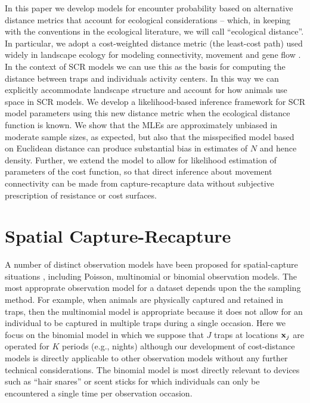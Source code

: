 \documentclass[12pt]{article}
\begin{document}
In this paper we develop models for encounter probability based on
alternative distance metrics that account for ecological
considerations -- which, in keeping with the conventions in the
ecological literature, we will call ``ecological distance''. In
particular, we adopt a cost-weighted distance metric (the least-cost path)
used widely in landscape ecology for modeling connectivity,
movement and gene flow
\citep{adriaensen_etal:2003,manel_etal:2003,mcrae_etal:2008}. In the
context of SCR models we can use this as the basis for computing the
distance between traps and individuals activity centers. In this way
we can explicitly accommodate landscape structure and
account for how animals use space in SCR models. We develop a
likelihood-based inference framework for SCR model parameters using
this new distance metric when the ecological distance function is
known.  We show that the MLEs are approximately unbiased in moderate
sample sizes, as expected, but also that the misspecified model based
on Euclidean distance can produce substantial bias in estimates of $N$
and hence density.  Further, we extend the model to allow for likelihood 
estimation of parameters of the cost function, so that direct inference
about movement connectivity can be made from capture-recapture data without subjective prescription
of resistance or cost surfaces.


\section{Spatial Capture-Recapture}

A number of distinct observation models have been proposed for
spatial-capture situations \citep{borchers_efford:2008,
  royle_etal:2009ecol, efford_etal:2009ecol}, including Poisson, multinomial or binomial
observation models. The most
approprate observation model for a dataset depends upon the the
sampling method.
For example, when animals are physically captured and retained
in traps, then the multinomial model is appropriate because it does not
allow for an individual to be captured in multiple traps during a
single occasion. Here we focus on the binomial model in which we
suppose that $J$ traps at locations ${\bf x}_{j}$ are operated for $K$
periods (e.g., nights) although our development of cost-distance
models is directly applicable to other observation models without any
further technical considerations. The binomial model is most directly
relevant to devices such as ``hair snares''
\citep{woods_etal:1999,gardner_etal:2010} or scent sticks
\citep{kery_etal:2010} for which individuals can only be encountered a
single time per observation occasion.
\end{document}
